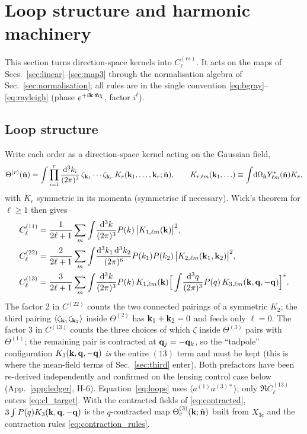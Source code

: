 \section{Loop structure and harmonic machinery}
\label{sec:harmonic}
This section turns direction-space kernels into $C^{(rs)}_\ell$.  It acts on the maps of Secs.~\ref{sec:linear}--\ref{sec:map3}
through the normalisation algebra of Sec.~\ref{sec:normalisation}; all rules are in the single convention
\eqref{eq:bgray}--\eqref{eq:rayleigh} (phase $e^{+i\mathbf k\cdot\hat{\mathbf n}\chi}$, factor $i^\ell$).

\subsection{Loop structure}
\label{sec:loops}
Write each order as a direction-space kernel acting on the Gaussian field,
\begin{equation}
\Theta^{(r)}(\hat{\mathbf n})=\int\prod_{i=1}^r\frac{\mathrm d^3k_i}{(2\pi)^3}\,\zeta_{\mathbf k_1}\cdots\zeta_{\mathbf k_r}\,K_r(\mathbf k_1,\ldots,\mathbf k_r;\hat{\mathbf n}),
\qquad K_{r,\ell m}(\mathbf k_1,\ldots)\equiv\int\!\mathrm d\Omega_{\hat{\mathbf n}}Y^*_{\ell m}(\hat{\mathbf n})K_r ,
\label{eq:Kr}
\end{equation}
with $K_r$ symmetric in its momenta (symmetrise if necessary).  Wick's theorem for $\ell\ge1$ then gives
\begin{align}
C^{(11)}_\ell&=\frac1{2\ell+1}\sum_m\int\!\frac{\mathrm d^3k}{(2\pi)^3}P(k)\,\big|K_{1,\ell m}(\mathbf k)\big|^2,\nonumber\\
C^{(22)}_\ell&=\frac{2}{2\ell+1}\sum_m\int\!\frac{\mathrm d^3k_1\,\mathrm d^3k_2}{(2\pi)^6}P(k_1)P(k_2)\,\big|K_{2,\ell m}(\mathbf k_1,\mathbf k_2)\big|^2,\nonumber\\
C^{(13)}_\ell&=\frac{3}{2\ell+1}\sum_m\int\!\frac{\mathrm d^3k}{(2\pi)^3}P(k)\,K_{1,\ell m}(\mathbf k)\Big[\int\!\frac{\mathrm d^3q}{(2\pi)^3}P(q)\,K_{3,\ell m}(\mathbf k,\mathbf q,-\mathbf q)\Big]^* .
\label{eq:loops}
\end{align}
The factor 2 in $C^{(22)}$ counts the two connected pairings of a symmetric $K_2$; the third pairing
$\langle\zeta_{\mathbf k_1}\zeta_{\mathbf k_2}\rangle$ inside $\Theta^{(2)}$ has $\mathbf k_1+\mathbf k_2=0$ and feeds only $\ell=0$.
The factor 3 in $C^{(13)}$ counts the three choices of which $\zeta$ inside $\Theta^{(3)}$ pairs with
$\Theta^{(1)}$; the remaining pair is contracted at $\mathbf q_j=-\mathbf q_k$, so the ``tadpole'' configuration
$K_3(\mathbf k,\mathbf q,-\mathbf q)$ \emph{is} the entire $(13)$ term and must be kept (this is where the mean-field terms of
Sec.~\ref{sec:third} enter).  Both prefactors have been re-derived independently and confirmed on the lensing
control case below (App.~\ref{app:ledger}, H-6).  Equation~\eqref{eq:loops} uses $\langle a^{(1)}a^{(3)*}\rangle$;
only $\Re C^{(13)}_\ell$ enters \eqref{eq:cl_target}.  With the contracted fields of \eqref{eq:contracted}, $3\int P(q)K_3(\mathbf k,\mathbf q,-\mathbf q)$ is the
$q$-contracted map $\Theta^{(3)}_c(\mathbf k;\hat{\mathbf n})$ built from $X_{3c}$ and the contraction rules
\eqref{eq:contraction_rules}.

